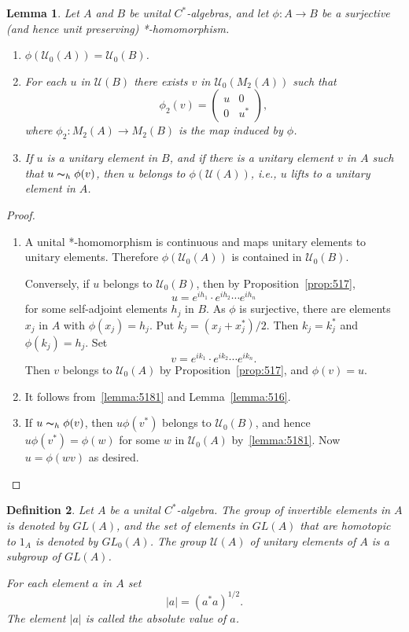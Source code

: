 \documentclass{book}
\newtheorem{definition}{Definition}[section]
\newtheorem{lemma}[definition]{Lemma}
\def\cstar{\(C^*\)-algebra}
\def\cstars{\(C^*\)-algebras}
\begin{document}
\begin{lemma}\label{lemma:518}
  Let \(A\) and \(B\) be unital \cstars, and let \(\phi:A\rightarrow B\) be a surjective
  (and hence unit preserving) *-homomorphism.
  \begin{enumerate}
    \item\label{lemma:5181} \(\phi(\mathcal{U}_0(A))=\mathcal{U}_0(B)\).
    \item For each \(u\) in \(\mathcal{U}(B)\) there exists \(v\) in \(\mathcal{U}_0(M_2(A))\) such that
      \[\phi_2(v)=\begin{pmatrix}
        u&0\\0&u^*
      \end{pmatrix},\]
      where \(\phi_2: M_2(A) \rightarrow M_2(B)\) is the map induced by \(\phi\).
    \item If \(u\) is a unitary element in \(B\), and if there is a unitary element \(v\) in \(A\) such that 
      \(u\thicksim_h \phi(v)\), then \(u\) belongs to \(\phi(\mathcal{U}(A))\), i.e., \(u\) lifts to a unitary element in \(A\).
  \end{enumerate}
\end{lemma}
\begin{proof}
  \begin{enumerate}
    \item A unital *-homomorphism is continuous and maps unitary elements to unitary elements.
      Therefore \(\phi(\mathcal{U}_0(A))\) is contained in \(\mathcal{U}_0(B)\).\par
      Conversely, if \(u\) belongs to \(\mathcal{U}_0(B)\), then by Proposition~\ref{prop:517},
      \[
        u=e^{ih_1}\cdot e^{ih_2}\cdots e^{ih_n}
      \]
      for some self-adjoint elements \(h_j\) in \(B\). As \(\phi\) is surjective, there are elements \(x_j\) in \(A\)
      with \(\phi(x_j)=h_j\). Put \(k_j=(x_j+x^*_j)/2\). Then \(k_j=k_j^*\) and \(\phi(k_j)=h_j\). Set
      \[
        v=e^{ik_1}\cdot e^{ik_2}\cdots e^{ik_n}.
      \]
      Then \(v\) belongs to \(\mathcal{U}_0(A)\) by Proposition~\ref{prop:517}, and \(\phi(v)=u\).
    \item It follows from~\ref{lemma:5181} and Lemma~\ref{lemma:516}. 
    \item If \(u\thicksim_h \phi(v)\), then \(u\phi(v^*)\) belongs to \(\mathcal{U}_0(B)\), and hence
      \(u\phi(v^*)=\phi(w)\) for some \(w\) in \(\mathcal{U}_0(A)\) by~\ref{lemma:5181}. Now \(u=\phi(wv)\) as desired.
  \end{enumerate}
\end{proof}
\begin{definition}
  Let \(A\) be a unital \cstar. The group of invertible elements in \(A\) is denoted by \(GL(A)\),
  and the set of elements in \(GL(A)\) that are homotopic to \(1_A\) is denoted by \(GL_0(A)\).
  The group \(\mathcal{U}(A)\) of unitary elements of \(A\) is a subgroup of \(GL(A)\).\par
  For each element \(a\) in \(A\) set 
  \[|a|={(a^* a)}^{1/2}.\]
  The element \(|a|\) is called the \textnormal{absolute value} of \(a\).
\end{definition}
\end{document}
